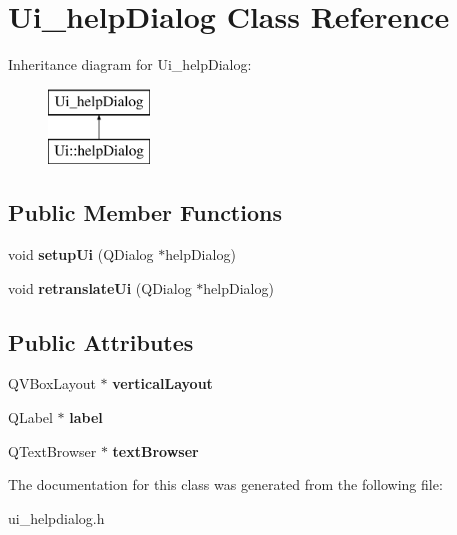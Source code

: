 \hypertarget{classUi__helpDialog}{\section{Ui\-\_\-help\-Dialog Class Reference}
\label{classUi__helpDialog}
}
Inheritance diagram for Ui\-\_\-help\-Dialog\-:\begin{figure}[H]
\begin{center}
\leavevmode
\includegraphics[height=2.000000cm]{classUi__helpDialog}
\end{center}
\end{figure}
\subsection*{Public Member Functions}
\begin{DoxyCompactItemize}
\item 
\hypertarget{classUi__helpDialog_a4074ac03760c68b2a4d9ba5e9aa47f4b}{void {\bfseries setup\-Ui} (Q\-Dialog $\ast$help\-Dialog)}\label{classUi__helpDialog_a4074ac03760c68b2a4d9ba5e9aa47f4b}

\item 
\hypertarget{classUi__helpDialog_a2f67a7a9b16bb22a264d312234c7e60d}{void {\bfseries retranslate\-Ui} (Q\-Dialog $\ast$help\-Dialog)}\label{classUi__helpDialog_a2f67a7a9b16bb22a264d312234c7e60d}

\end{DoxyCompactItemize}
\subsection*{Public Attributes}
\begin{DoxyCompactItemize}
\item 
\hypertarget{classUi__helpDialog_a1ee746becdf3250a159a36bc7e0d2724}{Q\-V\-Box\-Layout $\ast$ {\bfseries vertical\-Layout}}\label{classUi__helpDialog_a1ee746becdf3250a159a36bc7e0d2724}

\item 
\hypertarget{classUi__helpDialog_a67c0a23bf50b0edc6a2328499a0c412d}{Q\-Label $\ast$ {\bfseries label}}\label{classUi__helpDialog_a67c0a23bf50b0edc6a2328499a0c412d}

\item 
\hypertarget{classUi__helpDialog_aed3e82f455f7e3b3da6df686f1d6d200}{Q\-Text\-Browser $\ast$ {\bfseries text\-Browser}}\label{classUi__helpDialog_aed3e82f455f7e3b3da6df686f1d6d200}

\end{DoxyCompactItemize}


The documentation for this class was generated from the following file\-:\begin{DoxyCompactItemize}
\item 
ui\-\_\-helpdialog.\-h\end{DoxyCompactItemize}
